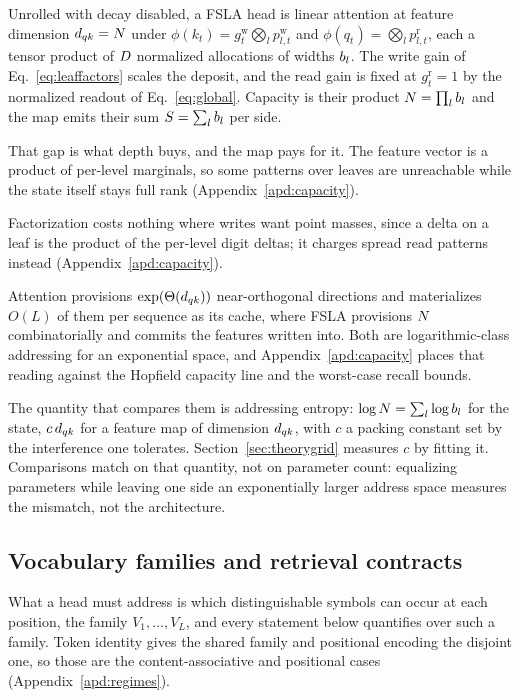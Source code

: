 \begin{proposition}
\label{prop:identity}
Unrolled with decay disabled, a FSLA head is linear attention at feature dimension $d_{qk} = N$ under $\phi(k_t) = g^{\mathrm{w}}_t \bigotimes_l p^{\mathrm{w}}_{l,t}$ and $\phi(q_t) = \bigotimes_l p^{\mathrm{r}}_{l,t}$, each a tensor product of $D$ normalized allocations of widths $b_l$. The write gain of Eq.~\eqref{eq:leaffactors} scales the deposit, and the read gain is fixed at $g^{\mathrm{r}}_t = 1$ by the normalized readout of Eq.~\eqref{eq:global}. Capacity is their product $N = \prod_l b_l$ and the map emits their sum $S = \sum_l b_l$ per side.
\end{proposition}

That gap is what depth buys, and the map pays for it. The feature vector is a product of per-level marginals, so some patterns over leaves are unreachable while the state itself stays full rank (Appendix~\ref{apd:capacity}).

Factorization costs nothing where writes want point masses, since a delta on a leaf is the product of the per-level digit deltas; it charges spread read patterns instead (Appendix~\ref{apd:capacity}).

Attention provisions $\exp(\Theta(d_{qk}))$ near-orthogonal directions and materializes $O(L)$ of them per sequence as its cache, where FSLA provisions $N$ combinatorially and commits the features written into. Both are logarithmic-class addressing for an exponential space, and Appendix~\ref{apd:capacity} places that reading against the Hopfield capacity line and the worst-case recall bounds.


The quantity that compares them is addressing entropy: $\log N = \sum_l \log b_l$ for the state, $c\,d_{qk}$ for a feature map of dimension $d_{qk}$, with $c$ a packing constant set by the interference one tolerates. Section~\ref{sec:theorygrid} measures $c$ by fitting it. Comparisons match on that quantity, not on parameter count: equalizing parameters while leaving one side an exponentially larger address space measures the mismatch, not the architecture.

\subsection{Vocabulary families and retrieval contracts}
\label{sec:families}

What a head must address is which distinguishable symbols can occur at each position, the family $V_1,\dots,V_L$, and every statement below quantifies over such a family. Token identity gives the shared family and positional encoding the disjoint one, so those are the content-associative and positional cases (Appendix~\ref{apd:regimes}).

